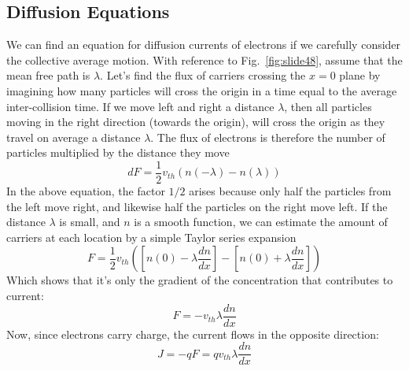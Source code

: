 \subsection{Diffusion Equations}
We can find an equation for diffusion currents of electrons if we carefully consider the collective average motion.  With reference to Fig.~\ref{fig:slide48}, assume that the mean free path is $\lambda$.  Let’s find the flux of carriers crossing the $x=0$ plane by imagining how many particles will cross the origin in a time equal to the average inter-collision time.  If we move left and right a distance $\lambda$, then all particles moving in the right direction (towards the origin), will cross the origin as they travel on average a distance $\lambda$.  The flux of electrons is therefore the number of particles multiplied by the distance they move
\begin{equation}d
        F = \frac{1}{2}{v_{th}}\left( {n( - \lambda ) - n(\lambda )} \right)
\end{equation}
In the above equation, the factor $1/2$ arises because only half the particles from the left move right, and likewise half the particles on the right move left.  If the distance $\lambda$ is small, and $n$ is a smooth function, we can estimate the amount of carriers at each location by a simple Taylor series expansion
\begin{equation}
        F = \frac{1}{2}{v_{th}}\left( {\left[ {n(0) - \lambda \frac{{dn}}{{dx}}} \right] -
         \left[ {n(0) + \lambda \frac{{dn}}{{dx}}} \right]} \right)
\end{equation}
Which shows that it’s only the gradient of the concentration that contributes to current:
\begin{equation}
        F =  - {v_{th}}\lambda \frac{{dn}}{{dx}}
\end{equation}
Now, since electrons carry charge, the current flows in the opposite direction:
\begin{equation}
        J =  - qF = q{v_{th}}\lambda \frac{{dn}}{{dx}}
\end{equation}

